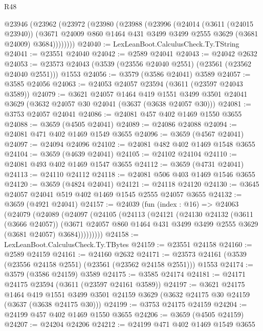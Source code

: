\begin{lexlean}{R48}
\begin{coremodule}
    @23946
      (@23962
        (@23972
          (@23980
            (@23988
              (@23996
                (@24014
                  (@3611 (@24015 @23940))
                  (@3671 @24009 @860 @1464 @431 @3499 @3499 @2555 @3629 (@3681 @24009) @3684))))))))
@24040 := LexLeanBoot.CalculusCheck.Ty.TString
@24041 := @23551 @24040
@24042 := @2589 @24041
@24043 := @24042 @2632
@24053 := @23573 @24043 (@3539 (@23556 @24040 @2551) (@23561 (@23562 @24040 @2551))) @1553
@24056 := @3579 (@3586 @24041) @3589
@24057 := @3585 @24056
@24063 := @24053 @24057 @23594 (@3611 (@23597 @24043 @3589))
@24079 := @3621
    @24057
    @1464
    @419
    @1551
    @3499
    @3501
    @24041
    @3629
    (@3632 @24057 @30 @24041 (@3637 (@3638 @24057 @30)))
@24081 := @3753 @24057 @24041
@24086 := @24081 @457 @402 @1469 @1550 @3655
@24088 := @3659 (@4505 @24041)
@24089 := @24086 @24088
@24094 := @24081 @471 @402 @1469 @1549 @3655
@24096 := @3659 (@4567 @24041)
@24097 := @24094 @24096
@24102 := @24081 @482 @402 @1469 @1548 @3655
@24104 := @3659 (@4639 @24041)
@24105 := @24102 @24104
@24110 := @24081 @493 @402 @1469 @1547 @3655
@24112 := @3659 (@4731 @24041)
@24113 := @24110 @24112
@24118 := @24081 @506 @403 @1469 @1546 @3655
@24120 := @3659 (@4824 @24041)
@24121 := @24118 @24120
@24130 := @3645 @24057 @24041 @519 @402 @1469 @1545 @2555 @24057 @3655
@24132 := @3659 (@4921 @24041)
@24157 := @24039
    (fun (index : @16) =>
    @24063
      (@24079
        (@24089
          (@24097
            (@24105
              (@24113
                (@24121
                  (@24130
                    @24132
                    (@3611 (@3666 @24057))
                    (@3671
                      @24057
                      @860
                      @1464
                      @431
                      @3499
                      @3499
                      @2555
                      @3629
                      (@3681 @24057)
                      @3684)))))))))
@24158 := LexLeanBoot.CalculusCheck.Ty.TBytes
@24159 := @23551 @24158
@24160 := @2589 @24159
@24161 := @24160 @2632
@24171 := @23573 @24161 (@3539 (@23556 @24158 @2551) (@23561 (@23562 @24158 @2551))) @1553
@24174 := @3579 (@3586 @24159) @3589
@24175 := @3585 @24174
@24181 := @24171 @24175 @23594 (@3611 (@23597 @24161 @3589))
@24197 := @3621
    @24175
    @1464
    @419
    @1551
    @3499
    @3501
    @24159
    @3629
    (@3632 @24175 @30 @24159 (@3637 (@3638 @24175 @30)))
@24199 := @3753 @24175 @24159
@24204 := @24199 @457 @402 @1469 @1550 @3655
@24206 := @3659 (@4505 @24159)
@24207 := @24204 @24206
@24212 := @24199 @471 @402 @1469 @1549 @3655

\end{coremodule}
\end{lexlean}
